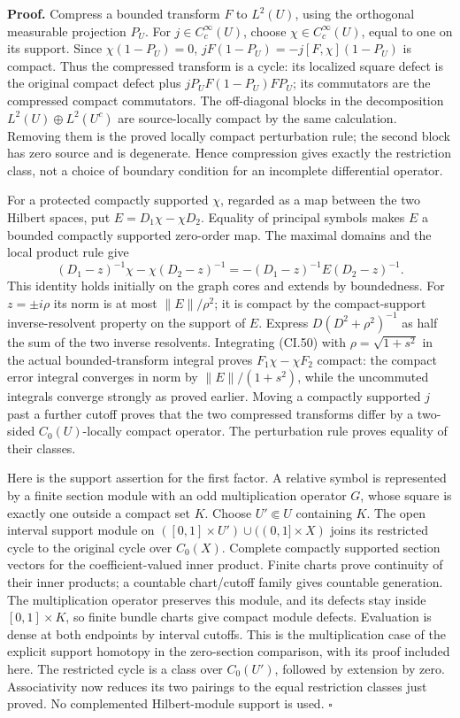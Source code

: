 \documentclass[
  11pt,
]{article}
\begin{document}
\textbf{Proof.} Compress a bounded transform \(F\) to \(L^2(U)\), using
the orthogonal measurable projection \(P_U\). For
\(j\in C_c^\infty(U)\), choose \(\chi\in C_c^\infty(U)\), equal to one
on its support. Since \(\chi(1-P_U)=0\), \(jF(1-P_U)=-j[F,\chi](1-P_U)\)
is compact. Thus the compressed transform is a cycle: its localized
square defect is the original compact defect plus \(jP_UF(1-P_U)FP_U\);
its commutators are the compressed compact commutators. The off-diagonal
blocks in the decomposition \(L^2(U)\oplus L^2(U^c)\) are source-locally
compact by the same calculation. Removing them is the proved locally
compact perturbation rule; the second block has zero source and is
degenerate. Hence compression gives exactly the restriction class, not a
choice of boundary condition for an incomplete differential operator.

For a protected compactly supported \(\chi\), regarded as a map between
the two Hilbert spaces, put \(E=D_1\chi-\chi D_2\). Equality of
principal symbols makes \(E\) a bounded compactly supported zero-order
map. The maximal domains and the local product rule give \[
 (D_1-z)^{-1}\chi-\chi(D_2-z)^{-1}
       =-(D_1-z)^{-1}E(D_2-z)^{-1}.
 \tag{CI.50}
\] This identity holds initially on the graph cores and extends by
boundedness. For \(z=\pm i\rho\) its norm is at most \(\|E\|/\rho^2\);
it is compact by the compact-support inverse-resolvent property on the
support of \(E\). Express \(D(D^2+\rho^2)^{-1}\) as half the sum of the
two inverse resolvents. Integrating (CI.50) with \(\rho=\sqrt{1+s^2}\)
in the actual bounded-transform integral proves \(F_1\chi-\chi F_2\)
compact: the compact error integral converges in norm by
\(\|E\|/(1+s^2)\), while the uncommuted integrals converge strongly as
proved earlier. Moving a compactly supported \(j\) past a further cutoff
proves that the two compressed transforms differ by a two-sided
\(C_0(U)\)-locally compact operator. The perturbation rule proves
equality of their classes.

Here is the support assertion for the first factor. A relative symbol is
represented by a finite section module with an odd multiplication
operator \(G\), whose square is exactly one outside a compact set \(K\).
Choose \(U'\Subset U\) containing \(K\). The open interval support
module on \(([0,1]\times U')\cup((0,1]\times X)\) joins its restricted
cycle to the original cycle over \(C_0(X)\). Complete compactly
supported section vectors for the coefficient-valued inner product.
Finite charts prove continuity of their inner products; a countable
chart/cutoff family gives countable generation. The multiplication
operator preserves this module, and its defects stay inside
\([0,1]\times K\), so finite bundle charts give compact module defects.
Evaluation is dense at both endpoints by interval cutoffs. This is the
multiplication case of the explicit support homotopy in the zero-section
comparison, with its proof included here. The restricted cycle is a
class over \(C_0(U')\), followed by extension by zero. Associativity now
reduces its two pairings to the equal restriction classes just proved.
No complemented Hilbert-module support is used. \(\square\)
\end{document}
